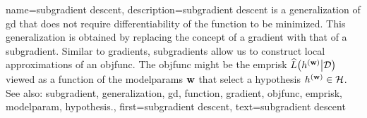 {name={subgradient descent}, 
	description={\Gls{subgradient} 
		descent is a \gls{generalization} of \gls{gd} that does not require differentiability of the 
		\gls{function} to be minimized. This \gls{generalization} is obtained by replacing the concept 
		of a \gls{gradient} with that of a \gls{subgradient}. Similar to \glspl{gradient}, \glspl{subgradient} 
		allow us to construct local approximations of an \gls{objfunc}. The \gls{objfunc} 
		might be the \gls{emprisk} $\widehat{L}\big( h^{({\bf w})} \big| \mathcal{D} \big)$ viewed 
		as a \gls{function} of the \glspl{modelparam} ${\bf w}$ that select a \gls{hypothesis} $h^{({\bf w})} \in \mathcal{H}$.
				\\
		See also: \gls{subgradient}, \gls{generalization}, \gls{gd}, \gls{function}, \gls{gradient}, \gls{objfunc}, \gls{emprisk}, \gls{modelparam}, \gls{hypothesis}.},
	first={subgradient descent},
	text={subgradient descent} 
}
	
